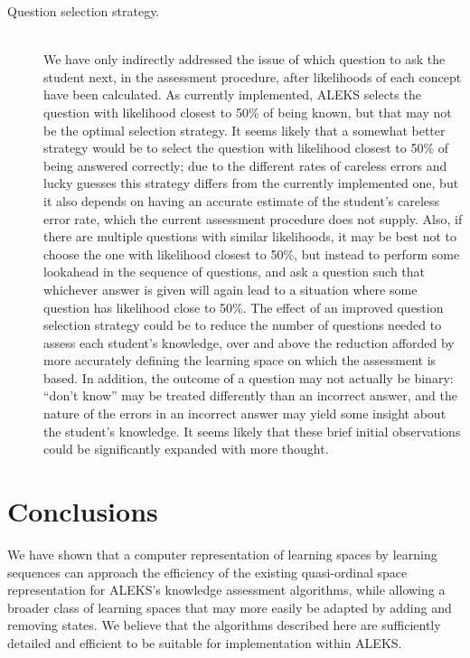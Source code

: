 \documentclass[11pt]{llncs}
\begin{document}
{\begin{description}
\item[Question selection strategy.] \hfill\\
We have only indirectly addressed the issue of which question to ask the student next, in the assessment procedure, after likelihoods of each concept have been calculated.
As currently implemented, ALEKS selects the question with likelihood closest to 50\% of being known, but that may not be the optimal selection strategy. It seems likely that a somewhat better strategy would be to select the question with likelihood closest to 50\% of being answered correctly; due to the different rates of careless errors and lucky guesses this strategy differs from the currently implemented one, but it also depends on having an accurate estimate of the student's careless error rate, which the current assessment procedure does not supply. Also, if there are multiple questions with similar likelihoods, it may be best not to choose the one with likelihood closest to 50\%, but instead to perform some lookahead in the sequence of questions, and ask a question such that whichever answer is given will again lead to a situation where some question has likelihood close to 50\%. The effect of an improved question selection strategy could be to reduce the number of questions needed to assess each student's knowledge, over and above the reduction afforded by more accurately defining the learning space on which the assessment is based. In addition, the outcome of a question may not actually be binary: ``don't know'' may be treated differently than an incorrect answer, and the nature of the errors in an incorrect answer may yield some insight about the student's knowledge. It seems likely that these brief initial observations could be significantly expanded with more thought.
\end{description}

\section{Conclusions}

We have shown that a computer representation of learning spaces by learning sequences can approach the efficiency of the existing quasi-ordinal space representation for ALEKS's knowledge assessment algorithms, while allowing a broader class of learning spaces that may more easily be adapted by adding and removing states. We believe that the algorithms described here are sufficiently detailed and efficient to be suitable for implementation within ALEKS.

}
\end{document}
